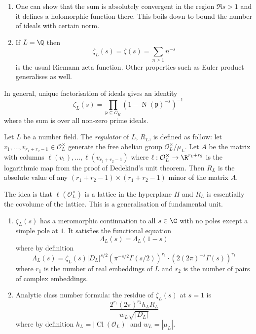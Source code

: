 \documentclass[a4paper]{article}
\renewcommand*{\O}{\mathcal{O}}
\DeclareMathOperator{\n}{N}
\DeclareMathOperator{\Cl}{Cl}%
\begin{document}
\begin{note}\leavevmode
  \begin{enumerate}
  \item One can show that the sum is absolutely convergent in the region \(\Re s > 1\) and it defines a holomorphic function there. This boils down to bound the number of ideals with certain norm.
  \item If \(L = \Q\) then
\[
  \zeta_L(s) = \zeta(s) = \sum_{n \geq 1} n^{-s}
\]
is the usual Riemann zeta function. Other properties such as Euler product generalises as well.
  \end{enumerate}
\end{note}

In general, unique factorisation of ideals gives an identity
\[
  \zeta_L(s) = \prod_{\mathfrak p \subseteq \O_K} (1 - \n(\mathfrak p)^{-s})^{-1}
\]
where the sum is over all non-zero prime ideals.

\begin{definition}[Regulator]
  Let \(L\) be a number field. The \emph{regulator} of \(L\), \(R_L\), is defined as follow: let \(v_1, \dots, v_{r_1 + r_2 - 1} \in \O_L^\times\) generate the free abelian group \(\O_L^\times/\mu_L\). Let \(A\) be the matrix with columns \(\ell(v_1), \dots, \ell(v_{r_1 + r_2 - 1})\) where \(\ell: \O_L^\times \to \R^{r_1 + r_2}\) is the logarithmic map from the proof of Dedekind's unit theorem. Then \(R_L\) is the absolute value of any \((r_1 + r_2 - 1) \times (r_1 + r_2 - 1)\) minor of the matrix \(A\).
\end{definition}

The idea is that \(\ell(\O_L^\times)\) is a lattice in the hyperplane \(H\) and \(R_L\) is essentially the covolume of the lattice. This is a generalisation of fundamental unit.

\begin{theorem}\leavevmode
  \begin{enumerate}
  \item \(\zeta_L(s)\) has a meromorphic continuation to all \(s \in \C\) with no poles except a simple pole at \(1\). It satisfies the functional equation
    \[
      \Lambda_L(s) = \Lambda_L(1 - s)
    \]
    where by definition
    \[
      \Lambda_L(s) = \zeta_L(s) |D_L|^{s/2} (\pi^{-s/2} \Gamma(s/2))^{r_1} \cdot (2 (2\pi)^{-s} \Gamma(s))^{r_1}
    \]
    where \(r_1\) is the number of real embeddings of \(L\) and \(r_2\) is the number of pairs of complex embeddings.
  \item Analytic class number formula: the residue of \(\zeta_L(s)\) at \(s = 1\) is
    \[
      \frac{2^{r_1} (2\pi)^{r_2} h_L R_L}{w_L \sqrt{|D_L|}}
    \]
    where by definition \(h_L = |\Cl(\O_L)|\) and \(w_L = |\mu_L|\).
  \end{enumerate}
\end{theorem}
\end{document}
